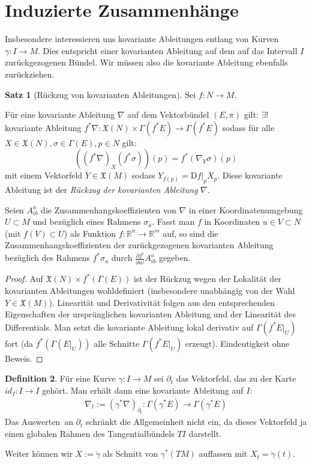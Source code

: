 \documentclass[a4paper]{scrreprt}
\numberwithin{equation}{chapter}
\newcommand{\DD}{\mathrm{D}}
\newcommand{\R}{\mathbb{R}}
\newcommand{\vf}{\mathfrak{X}}
\theoremstyle{definition}
\newtheorem{defn}{Definition}[section]
\newtheorem{satz}[defn]{Satz}
\begin{document}
	\section{Induzierte Zusammenhänge}
		Insbesondere interessieren uns kovariante Ableitungen entlang von Kurven $\gamma\colon I\rightarrow M$. Dies entspricht einer kovarianten Ableitung auf dem auf das Intervall $I$ zurückgezogenen Bündel. Wir müssen also die kovariante Ableitung ebenfalls zurückziehen.
		\begin{satz}[Rückzug von kovarianten Ableitungen]
			Sei $f\colon N\rightarrow M$.
			
			Für eine kovariante Ableitung $\nabla$ auf dem Vektorbündel $(E,\pi)$ gilt: $\exists!$ kovariante Ableitung $f^*\nabla\colon\vf(N)\times\Gamma(f^*E)\rightarrow \Gamma(f^*E)$ sodass für alle $X\in\vf(N),\sigma\in\Gamma(E), {p \in N}$ gilt:
			\begin{equation*}
				\left(\left(f^*\nabla\right)_X(f^*\sigma)\right)(p)=f^*\left(\nabla_Y\sigma\right)(p)
			\end{equation*}
			mit einem Vektorfeld $Y\in\vf(M)$ sodass $Y_{f(p)}=\DD f\vert_p X_p$. Diese kovariante Ableitung ist der \emph{Rückzug der kovarianten Ableitung} $\nabla$.
			
			Seien $A_{ib}^a$ die Zusammenhangskoeffizienten von $\nabla$ in einer Koordinatenumgebung $U\subset M$ und bezüglich eines Rahmens $\sigma_a$.
			Fasst man $f$ in Koordinaten $u\in V\subset N$ (mit $f(V)\subset U$) als Funktion $f\colon\R^n\rightarrow\R^m$ auf, so sind die Zusammenhangskoeffizienten der zurückgezogenen kovarianten Ableitung bezüglich des Rahmens $f^*\sigma_a$ durch $\frac{\partial f^i}{\partial u^j}A_{ib}^a$ gegeben.
			\begin{proof}
				Auf $\vf(N)\times f^*(\Gamma(E))$ ist der Rückzug wegen der Lokalität der kovarianten Ableitungen wohldefiniert (insbesondere unabhängig von der Wahl $Y\in\vf(M)$). Linearität und Derivativität folgen aus den entsprechenden Eigenschaften der ursprünglichen kovarianten Ableitung und der Linearität des Differentials. Man setzt die kovariante Ableitung lokal derivativ auf $\Gamma(f^*E\vert_U)$ fort (da $f^*(\Gamma(E\vert_U))$ alle Schnitte $\Gamma(f^*E\vert_U)$ erzeugt). Eindeutigkeit ohne Beweis.
			\end{proof}
		\end{satz}
		\begin{defn}
			Für eine Kurve $\gamma\colon I\rightarrow M$ sei $\partial_t$ das Vektorfeld, das zu der Karte $id_I\colon I\rightarrow I$ gehört. Man erhält dann eine kovariante Ableitung auf $I$:
			\begin{align*}
				\nabla_t:=(\gamma^*\nabla)_{\partial_t}\colon\Gamma(\gamma^*E)\rightarrow\Gamma(\gamma^*E)
			\end{align*}
			Das \glqq Auswerten\grqq\ an $\partial_t$ schränkt die Allgemeinheit nicht ein, da dieses Vektorfeld ja einen globalen Rahmen des Tangentialbündels $TI$ darstellt.
			
			Weiter können wir $X:=\dot{\gamma}$ als Schnitt von $\gamma^*(TM)$ auffassen mit $X_t=\dot{\gamma}(t)$.  
		\end{defn}
\end{document}
